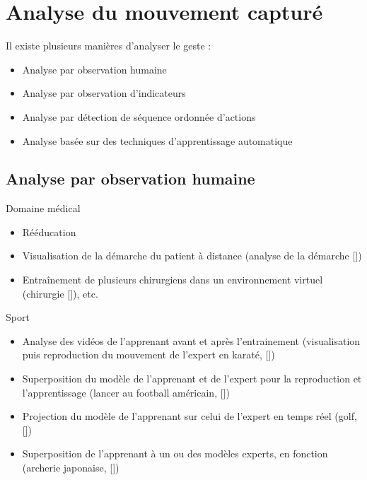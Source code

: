 \documentclass[svgnames]{beamer}
\newcommand{\mycite}[1]{[\textit{\cite{#1}}]}
\begin{document}
	\section{Analyse du mouvement capturé}
	\begin{frame}{\secname}
		Il existe plusieurs manières d'analyser le geste :
		\begin{itemize}[label=$\bullet$]
			\item Analyse par observation humaine
			\item Analyse par observation d'indicateurs
			\item Analyse par détection de séquence ordonnée d'actions
			\item Analyse basée sur des techniques d'apprentissage automatique
		\end{itemize}
	\end{frame}
	
	\subsection{Analyse par observation humaine}
	\begin{frame}{\subsecname}
		\begin{block}{Domaine médical}
			\begin{itemize}[label=$\bullet$]
				\item Rééducation
				\item Visualisation de la démarche du patient à distance (analyse de la démarche \mycite{Chen2016TPG})
				\item Entraînement de plusieurs chirurgiens dans un environnement virtuel (chirurgie \mycite{Pulijala2017VRS}), etc.
			\end{itemize}
		\end{block}
	\end{frame}
	
	\begin{frame}{\subsecname}
		\begin{block}{Sport}
			\begin{itemize}[label=$\bullet$]
				\item Analyse des vidéos de l'apprenant avant et après l'entrainement (visualisation puis reproduction du mouvement de l'expert en karaté, \mycite{Burns2011Uvh})
				\item Superposition du modèle de l'apprenant et de l'expert pour la reproduction et l'apprentissage (lancer au football américain, \mycite{LeNaour2019S3V})
				\item Projection du modèle de l'apprenant sur celui de l'expert en temps réel (golf, \mycite{Kora20151559})
				\item Superposition de l'apprenant à un ou des modèles experts, en fonction (archerie japonaise, \mycite{Yoshinaga2015Doa})
			\end{itemize}
		\end{block}
	\end{frame}
	
\end{document}
